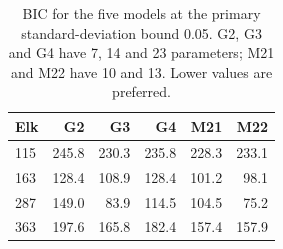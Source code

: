 \begin{table}[tbp]
\centering\small
\caption{BIC for the five models at the primary standard-deviation bound 0.05. G2, G3 and G4 have 7, 14 and 23 parameters; M21 and M22 have 10 and 13. Lower values are preferred.}\label{tab:elk-comparison}
\begin{tabular}{lrrrrr}\toprule
Elk & G2 & G3 & G4 & M21 & M22 \\\midrule
115 & 245.8 & 230.3 & 235.8 & 228.3 & 233.1 \\
163 & 128.4 & 108.9 & 128.4 & 101.2 & 98.1 \\
287 & 149.0 & 83.9 & 114.5 & 104.5 & 75.2 \\
363 & 197.6 & 165.8 & 182.4 & 157.4 & 157.9 \\
\bottomrule\end{tabular}
\end{table}
